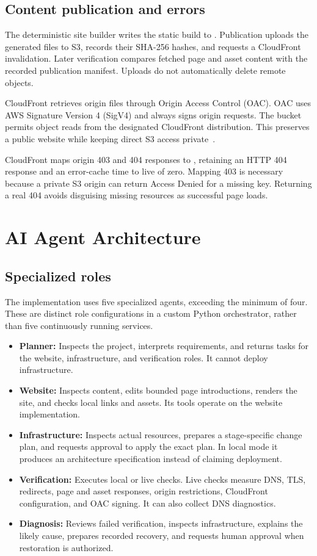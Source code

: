 \documentclass[11pt]{article}
\begin{document}
\subsection{Content publication and errors}
The deterministic site builder writes the static build to . Publication uploads the generated files to S3, records their SHA-256 hashes, and requests a CloudFront invalidation. Later verification compares fetched page and asset content with the recorded publication manifest. Uploads do not automatically delete remote objects.

CloudFront retrieves origin files through Origin Access Control (OAC). OAC uses AWS Signature Version 4 (SigV4) and always signs origin requests. The bucket permits object reads from the designated CloudFront distribution. This preserves a public website while keeping direct S3 access private~\cite{oac}.

CloudFront maps origin 403 and 404 responses to , retaining an HTTP 404 response and an error-cache time to live of zero. Mapping 403 is necessary because a private S3 origin can return Access Denied for a missing key. Returning a real 404 avoids disguising missing resources as successful page loads.

\section{AI Agent Architecture}
\subsection{Specialized roles}
The implementation uses five specialized agents, exceeding the minimum of four. These are distinct role configurations in a custom Python orchestrator, rather than five continuously running services.
\begin{itemize}
  \item \textbf{Planner:} Inspects the project, interprets requirements, and returns tasks for the website, infrastructure, and verification roles. It cannot deploy infrastructure.
  \item \textbf{Website:} Inspects content, edits bounded page introductions, renders the site, and checks local links and assets. Its tools operate on the website implementation.
  \item \textbf{Infrastructure:} Inspects actual resources, prepares a stage-specific change plan, and requests approval to apply the exact plan. In local mode it produces an architecture specification instead of claiming deployment.
  \item \textbf{Verification:} Executes local or live checks. Live checks measure DNS, TLS, redirects, page and asset responses, origin restrictions, CloudFront configuration, and OAC signing. It can also collect DNS diagnostics.
  \item \textbf{Diagnosis:} Reviews failed verification, inspects infrastructure, explains the likely cause, prepares recorded recovery, and requests human approval when restoration is authorized.
\end{itemize}
\end{document}
